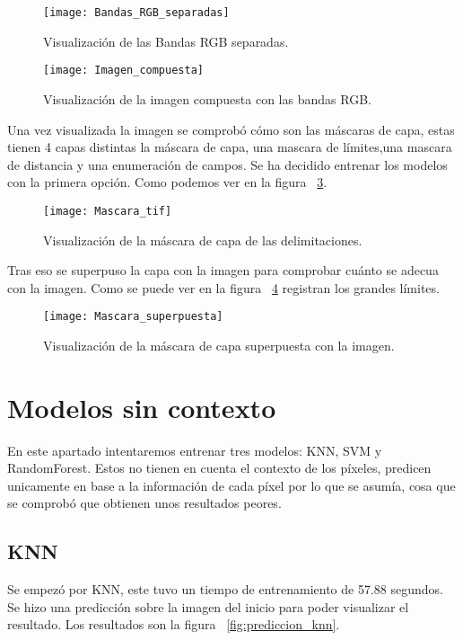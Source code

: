 \begin{figure}[H]
	\centering
	\texttt{[image: Bandas\_RGB\_separadas]}
	\caption[Visualización de las Bandas RGB separadas]{Visualización de las Bandas RGB separadas.}
	\label{fig:bandas_rgb}
\end{figure}

\begin{figure}[H]
	\centering
	\texttt{[image: Imagen\_compuesta]}
	\caption[Visualización de la imagen compuesta con las bandas RGB]{Visualización de la imagen compuesta con las bandas RGB.}
	\label{fig:imagen_compuesta}
\end{figure}

Una vez visualizada la imagen se comprobó cómo son las máscaras de capa, estas tienen 4 capas distintas la máscara de capa, una mascara de límites,una mascara de distancia y una enumeración de campos. Se ha decidido entrenar los modelos con la primera opción. Como podemos ver en la figura ~\ref{fig:mascara_sola}.

\begin{figure}[H]
	\centering
	\texttt{[image: Mascara\_tif]}
	\caption[Visualización de la máscara de capa de las delimitaciones]{Visualización de la máscara de capa de las delimitaciones.}
	\label{fig:mascara_sola}
\end{figure}

Tras eso se superpuso la capa con la imagen para comprobar cuánto se adecua con la imagen. Como se puede ver en la figura  ~\ref{fig:mascara_superpuesta} registran los grandes límites.

\begin{figure}
	\centering
	\texttt{[image: Mascara\_superpuesta]}
	\caption[Visualización de la máscara de capa superpuesta con la imagen]{Visualización de la máscara de capa superpuesta con la imagen.}
	\label{fig:mascara_superpuesta}
\end{figure}

 
\section{Modelos sin contexto}
En este apartado intentaremos entrenar tres modelos: KNN, SVM y RandomForest. Estos no tienen en cuenta el contexto de los píxeles, predicen unicamente en base a la información de cada píxel por lo que se asumía, cosa que se comprobó que obtienen unos resultados peores. 

\subsection{KNN}
Se empezó por KNN, este tuvo un tiempo de entrenamiento de 57.88 segundos. Se hizo una predicción sobre la imagen del inicio para poder visualizar el resultado. Los resultados son la figura ~\ref{fig:prediccion_knn}.

